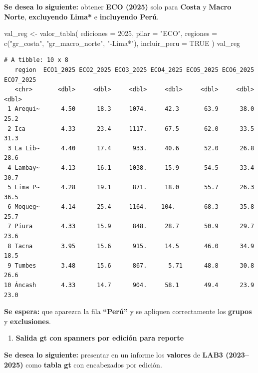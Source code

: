 \documentclass[
  11pt,
  letterpaper,
  DIV=11,
  numbers=noendperiod]{scrartcl}
\newenvironment{Shaded}{\begin{snugshade}}{\end{snugshade}}
\newcommand{\AttributeTok}[1]{\textcolor[rgb]{0.40,0.45,0.13}{#1}}
\newcommand{\ConstantTok}[1]{\textcolor[rgb]{0.56,0.35,0.01}{#1}}
\newcommand{\DecValTok}[1]{\textcolor[rgb]{0.68,0.00,0.00}{#1}}
\newcommand{\FunctionTok}[1]{\textcolor[rgb]{0.28,0.35,0.67}{#1}}
\newcommand{\NormalTok}[1]{\textcolor[rgb]{0.00,0.23,0.31}{#1}}
\newcommand{\OtherTok}[1]{\textcolor[rgb]{0.00,0.23,0.31}{#1}}
\newcommand{\StringTok}[1]{\textcolor[rgb]{0.13,0.47,0.30}{#1}}
\providecommand{\tightlist}{%
  \setlength{\itemsep}{0pt}\setlength{\parskip}{0pt}}\usepackage{longtable,booktabs,array}
\begin{document}
\textbf{Se desea lo siguiente:} obtener \textbf{ECO (2025)} solo para
\textbf{Costa} y \textbf{Macro Norte}, \textbf{excluyendo Lima*} e
\textbf{incluyendo Perú}.

\begin{Shaded}
\begin{Highlighting}[]
\NormalTok{val\_reg }\OtherTok{\textless{}{-}} \FunctionTok{valor\_tabla}\NormalTok{(}
  \AttributeTok{ediciones   =} \DecValTok{2025}\NormalTok{,}
  \AttributeTok{pilar       =} \StringTok{"ECO"}\NormalTok{,}
  \AttributeTok{regiones    =} \FunctionTok{c}\NormalTok{(}\StringTok{"gr\_costa"}\NormalTok{, }\StringTok{"gr\_macro\_norte"}\NormalTok{, }\StringTok{"{-}Lima*"}\NormalTok{),}
  \AttributeTok{incluir\_peru =} \ConstantTok{TRUE}
\NormalTok{)}
\NormalTok{val\_reg}
\end{Highlighting}
\end{Shaded}

\begin{verbatim}
# A tibble: 10 x 8
   region  ECO1_2025 ECO2_2025 ECO3_2025 ECO4_2025 ECO5_2025 ECO6_2025 ECO7_2025
   <chr>       <dbl>     <dbl>     <dbl>     <dbl>     <dbl>     <dbl>     <dbl>
 1 Arequi~      4.50      18.3     1074.     42.3       63.9      38.0      25.2
 2 Ica          4.33      23.4     1117.     67.5       62.0      33.5      31.3
 3 La Lib~      4.40      17.4      933.     40.6       52.0      26.8      28.6
 4 Lambay~      4.13      16.1     1038.     15.9       54.5      33.4      30.7
 5 Lima P~      4.28      19.1      871.     18.0       55.7      26.3      36.5
 6 Moqueg~      4.14      25.4     1164.    104.        68.3      35.8      25.7
 7 Piura        4.33      15.9      848.     28.7       50.9      29.7      23.6
 8 Tacna        3.95      15.6      915.     14.5       46.0      34.9      18.5
 9 Tumbes       3.48      15.6      867.      5.71      48.8      30.8      26.6
10 Áncash       4.33      14.7      904.     58.1       49.4      23.9      23.0
\end{verbatim}

\textbf{Se espera:} que aparezca la fila \textbf{``Perú''} y se apliquen
correctamente los \textbf{grupos} y \textbf{exclusiones}.

\begin{enumerate}
\def\labelenumi{\arabic{enumi}.}
\setcounter{enumi}{4}
\tightlist
\item
  \textbf{Salida gt con spanners por edición para reporte}
\end{enumerate}

\textbf{Se desea lo siguiente:} presentar en un informe los
\textbf{valores} de \textbf{LAB3 (2023--2025)} como \textbf{tabla gt}
con encabezados por edición.
\end{document}
